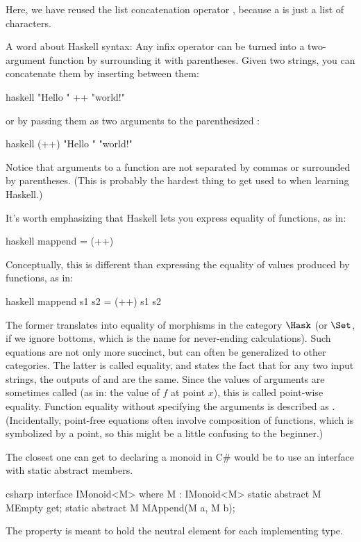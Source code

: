 Here, we have reused the list concatenation operator \code{(++)},
because a  is just a list of characters.

A word about Haskell syntax: Any infix operator can be turned into a
two-argument function by surrounding it with parentheses. Given two
strings, you can concatenate them by inserting \code{++} between them:

\begin{snip}{haskell}
"Hello " ++ "world!"
\end{snip}
or by passing them as two arguments to the parenthesized \code{(++)}:

\begin{snip}{haskell}
(++) "Hello " "world!"
\end{snip}
Notice that arguments to a function are not separated by commas or
surrounded by parentheses. (This is probably the hardest thing to get
used to when learning Haskell.)

It's worth emphasizing that Haskell lets you express equality of
functions, as in:

\begin{snip}{haskell}
mappend = (++)
\end{snip}
Conceptually, this is different than expressing the equality of values
produced by functions, as in:

\begin{snip}{haskell}
mappend s1 s2 = (++) s1 s2
\end{snip}
The former translates into equality of morphisms in the category
$\Hask$ (or $\Set$, if we ignore bottoms, which is the name
for never-ending calculations). Such equations are not only more
succinct, but can often be generalized to other categories. The latter
is called  equality, and states the fact that for any
two input strings, the outputs of  and \code{(++)} are
the same. Since the values of arguments are sometimes called
 (as in: the value of $f$ at point $x$), this is called
point-wise equality. Function equality without specifying the arguments
is described as . (Incidentally, point-free equations
often involve composition of functions, which is symbolized by a point,
so this might be a little confusing to the beginner.)

The closest one can get to declaring a monoid in C\# would be to use an
interface with static abstract members.

\begin{snip}{csharp}
interface IMonoid<M> where M : IMonoid<M>
{
    static abstract M MEmpty { get; }
    static abstract M MAppend(M a, M b);
}
\end{snip}
The  property is meant to hold the neutral element for each
implementing type.

